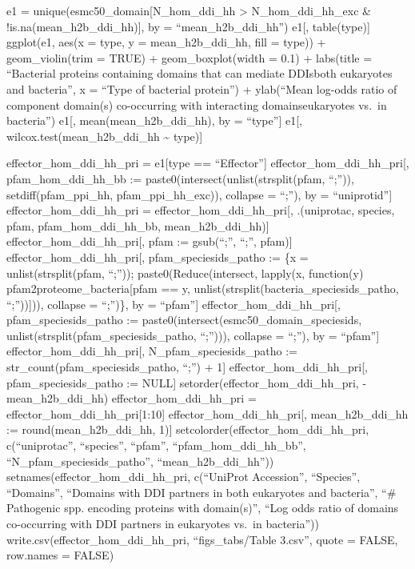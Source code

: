 \documentclass[
]{article}
\begin{document}
e1 = unique(esmc50\_domain{[}N\_hom\_ddi\_hh \textgreater{}
N\_hom\_ddi\_hh\_exc \& !is.na(mean\_h2b\_ddi\_hh){]}, by =
``mean\_h2b\_ddi\_hh'') e1{[}, table(type){]} ggplot(e1, aes(x = type, y
= mean\_h2b\_ddi\_hh, fill = type)) + geom\_violin(trim = TRUE) +
geom\_boxplot(width = 0.1) + labs(title = ``Bacterial proteins
containing domains that can mediate DDIs\nin both eukaryotes and
bacteria'', x = ``Type of bacterial protein'') + ylab(``Mean log-odds
ratio of component domain(s) co-occurring with interacting
domains\nin eukaryotes vs.~in bacteria'') e1{[},
mean(mean\_h2b\_ddi\_hh), by = ``type''{]} e1{[},
wilcox.test(mean\_h2b\_ddi\_hh \textasciitilde{} type){]}

effector\_hom\_ddi\_hh\_pri = e1{[}type == ``Effector''{]}
effector\_hom\_ddi\_hh\_pri{[}, pfam\_hom\_ddi\_hh\_bb :=
paste0(intersect(unlist(strsplit(pfam, ``;'')), setdiff(pfam\_ppi\_hh,
pfam\_ppi\_hh\_exc)), collapse = ``;''), by = ``uniprotid''{]}
effector\_hom\_ddi\_hh\_pri = effector\_hom\_ddi\_hh\_pri{[},
.(uniprotac, species, pfam, pfam\_hom\_ddi\_hh\_bb,
mean\_h2b\_ddi\_hh){]} effector\_hom\_ddi\_hh\_pri{[}, pfam :=
gsub(``;'', ``;'', pfam){]} effector\_hom\_ddi\_hh\_pri{[},
pfam\_speciesids\_patho := \{x = unlist(strsplit(pfam, ``;''));
paste0(Reduce(intersect, lapply(x, function(y)
pfam2proteome\_bacteria{[}pfam == y,
unlist(strsplit(bacteria\_speciesids\_patho, ``;'')){]})), collapse =
``;'')\}, by = ``pfam''{]} effector\_hom\_ddi\_hh\_pri{[},
pfam\_speciesids\_patho := paste0(intersect(esmc50\_domain\_speciesids,
unlist(strsplit(pfam\_speciesids\_patho, ``;''))), collapse = ``;''), by
= ``pfam''{]} effector\_hom\_ddi\_hh\_pri{[}, N\_pfam\_speciesids\_patho
:= str\_count(pfam\_speciesids\_patho, ``;'') + 1{]}
effector\_hom\_ddi\_hh\_pri{[}, pfam\_speciesids\_patho := NULL{]}
setorder(effector\_hom\_ddi\_hh\_pri, -mean\_h2b\_ddi\_hh)
effector\_hom\_ddi\_hh\_pri = effector\_hom\_ddi\_hh\_pri{[}1:10{]}
effector\_hom\_ddi\_hh\_pri{[}, mean\_h2b\_ddi\_hh :=
round(mean\_h2b\_ddi\_hh, 1){]} setcolorder(effector\_hom\_ddi\_hh\_pri,
c(``uniprotac'', ``species'', ``pfam'', ``pfam\_hom\_ddi\_hh\_bb'',
``N\_pfam\_speciesids\_patho'', ``mean\_h2b\_ddi\_hh''))
setnames(effector\_hom\_ddi\_hh\_pri, c(``UniProt Accession'',
``Species'', ``Domains'', ``Domains with DDI partners in both eukaryotes
and bacteria'', ``\# Pathogenic spp. encoding proteins with domain(s)'',
``Log odds ratio of domains co-occurring with DDI partners in eukaryotes
vs.~in bacteria'')) write.csv(effector\_hom\_ddi\_hh\_pri,
``figs\_tabs/Table 3.csv'', quote = FALSE, row.names = FALSE)
\end{document}
